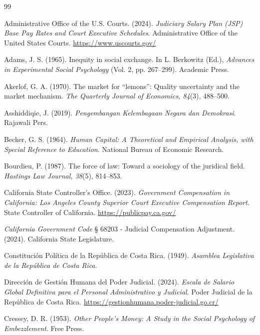 \documentclass[12pt, a4paper]{article}
\begin{document}
\newpage
\pagestyle{empty}
\renewcommand{\refname}{\textbf{REFERENCES}}
\begin{thebibliography}{99}

Administrative Office of the U.S. Courts. (2024). \textit{Judiciary Salary Plan (JSP) Base Pay Rates and Court Executive Schedules}. Administrative Office of the United States Courts. \url{https://www.uscourts.gov/}

Adams, J. S. (1965). Inequity in social exchange. In L. Berkowitz (Ed.), \textit{Advances in Experimental Social Psychology} (Vol. 2, pp. 267--299). Academic Press.

Akerlof, G. A. (1970). The market for ``lemons'': Quality uncertainty and the market mechanism. \textit{The Quarterly Journal of Economics, 84}(3), 488--500.

Asshiddiqie, J. (2019). \textit{Pengembangan Kelembagaan Negara dan Demokrasi}. Rajawali Pers.

Becker, G. S. (1964). \textit{Human Capital: A Theoretical and Empirical Analysis, with Special Reference to Education}. National Bureau of Economic Research.

Bourdieu, P. (1987). The force of law: Toward a sociology of the juridical field. \textit{Hastings Law Journal, 38}(5), 814--853.

California State Controller's Office. (2023). \textit{Government Compensation in California: Los Angeles County Superior Court Executive Compensation Report}. State Controller of California. \url{https://publicpay.ca.gov/}

\textit{California Government Code} § 68203 - Judicial Compensation Adjustment. (2024). California State Legislature.

Constitución Política de la República de Costa Rica. (1949). \textit{Asamblea Legislativa de la República de Costa Rica}.

Dirección de Gestión Humana del Poder Judicial. (2024). \textit{Escala de Salario Global Definitiva para el Personal Administrativo y Judicial}. Poder Judicial de la República de Costa Rica. \url{https://gestionhumana.poder-judicial.go.cr/}

Cressey, D. R. (1953). \textit{Other People's Money: A Study in the Social Psychology of Embezzlement}. Free Press.


\end{thebibliography}
\end{document}
